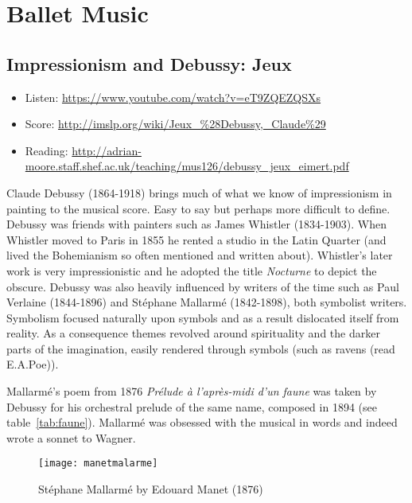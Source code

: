 
\chapter{Ballet Music}
\label{balletmusic}


\section{Impressionism and Debussy: Jeux}
\begin{itemize}
\item Listen: \url{https://www.youtube.com/watch?v=eT9ZQEZQSXs}
\item Score: \url{http://imslp.org/wiki/Jeux_%28Debussy,_Claude%29}
\item Reading: \url{http://adrian-moore.staff.shef.ac.uk/teaching/mus126/debussy_jeux_eimert.pdf}
\end{itemize}

Claude Debussy (1864-1918) brings much of what we know of impressionism in painting to the musical score. Easy to say but perhaps more difficult to define. Debussy was friends with painters such as James Whistler (1834-1903). When Whistler moved to Paris in 1855 he rented a studio in the Latin Quarter (and lived the Bohemianism so often mentioned and written about). Whistler's later work is very impressionistic and he adopted the title \textit{Nocturne} to depict the obscure.      
Debussy was also heavily influenced by writers of the time such as Paul Verlaine (1844-1896) and St\'ephane Mallarm\'e (1842-1898), both symbolist writers. Symbolism focused naturally upon symbols and as a result dislocated itself from reality. As a consequence themes revolved around spirituality and the darker parts of the imagination, easily rendered through symbols (such as ravens (read E.A.Poe)). 

Mallarm\'e's poem from 1876 \textit{Pr\'elude \`a l'apr\`es-midi d'un faune} was taken by Debussy for his orchestral prelude of the same name, composed in 1894 (see table~\ref{tab:faune}). Mallarm\'e was obsessed with the musical in words and indeed wrote a sonnet to Wagner. 

\begin{figure}[H]
\centering
\texttt{[image: manetmalarme]}\caption{St\'ephane Mallarm\'e by Edouard Manet (1876)}
\label{fig:quatierlatin}
\end{figure}

